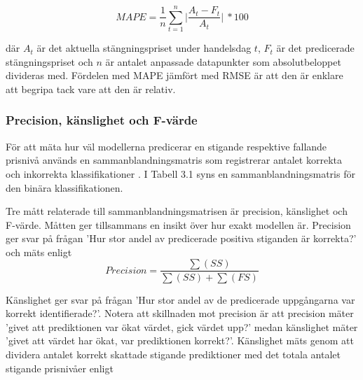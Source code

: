 \documentclass[11pt]{article}
\numberwithin{equation}{section}
\numberwithin{table}{section}
\numberwithin{figure}{section}
\begin{document}
\begin{equation}
    \textit{MAPE}=\frac{1}{n} 
    \sum_{t=1}^{n} \vert \frac{A_{t}-F_{t}}{A_{t}} \vert \ * 100
\end{equation}

där $A_{t}$ är det aktuella stängningspriset under handelsdag $t$, $F_{t}$ är det predicerade stängningspriset och $n$ är antalet anpassade datapunkter som absolutbeloppet divideras med. Fördelen med MAPE jämfört med RMSE är att den är enklare att begripa tack vare att den är relativ. 




\subsubsection{Precision, känslighet och F-värde}
För att mäta hur väl modellerna predicerar en stigande respektive fallande prisnivå används en sammanblandningsmatris som registrerar antalet korrekta och inkorrekta klassifikationer \parencite{ModelValidation}. I Tabell 3.1 syns en sammanblandningsmatris för den binära klassifikationen.

\begin{table}[H]
\caption{Binär klassifikationsmatris}
\end{table}

Tre mått relaterade till sammanblandningsmatrisen är precision, känslighet och F-värde. Måtten ger tillsammans en insikt över hur exakt modellen är. Precision ger svar på frågan 'Hur stor andel av predicerade positiva stiganden är korrekta?' och mäts enligt
\begin{equation}
    \textit{Precision} = \frac{\sum(SS)}{\sum(SS)+\sum(FS)} 
\end{equation}

Känslighet ger svar på frågan 'Hur stor andel av de predicerade uppgångarna var korrekt identifierade?'. Notera att skillnaden mot precision är att precision mäter 'givet att prediktionen var ökat värdet, gick värdet upp?' medan känslighet mäter 'givet att värdet har ökat, var prediktionen korrekt?'. Känslighet mäts genom att dividera antalet korrekt skattade stigande prediktioner med det totala antalet stigande prisnivåer enligt
\end{document}
